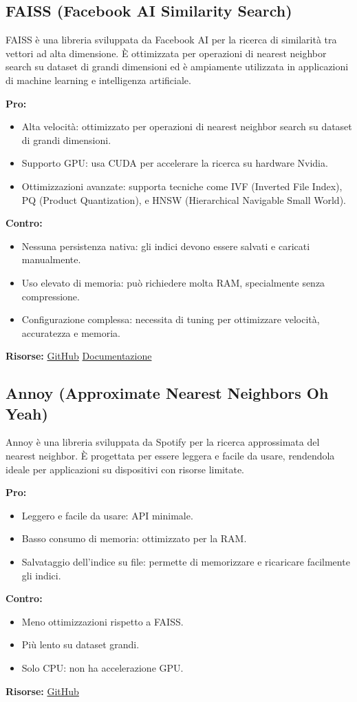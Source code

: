\documentclass{article}
\begin{document}
\subsection{FAISS (Facebook AI Similarity Search)}
FAISS è una libreria sviluppata da Facebook AI per la ricerca di similarità tra vettori ad alta dimensione. È ottimizzata per operazioni di nearest neighbor search su dataset di grandi dimensioni ed è ampiamente utilizzata in applicazioni di machine learning e intelligenza artificiale.

\textbf{Pro:}
\begin{itemize}
    \item Alta velocità: ottimizzato per operazioni di nearest neighbor search su dataset di grandi dimensioni.
    \item Supporto GPU: usa CUDA per accelerare la ricerca su hardware Nvidia.
    \item Ottimizzazioni avanzate: supporta tecniche come IVF (Inverted File Index), PQ (Product Quantization), e HNSW (Hierarchical Navigable Small World).
\end{itemize}
\textbf{Contro:}
\begin{itemize}
    \item Nessuna persistenza nativa: gli indici devono essere salvati e caricati manualmente.
    \item Uso elevato di memoria: può richiedere molta RAM, specialmente senza compressione.
    \item Configurazione complessa: necessita di tuning per ottimizzare velocità, accuratezza e memoria.
\end{itemize}
\textbf{Risorse:} \href{https://github.com/facebookresearch/faiss}{GitHub} \textbar{} \href{https://faiss.ai/}{Documentazione}

\subsection{Annoy (Approximate Nearest Neighbors Oh Yeah)}
Annoy è una libreria sviluppata da Spotify per la ricerca approssimata del nearest neighbor. È progettata per essere leggera e facile da usare, rendendola ideale per applicazioni su dispositivi con risorse limitate.

\textbf{Pro:}
\begin{itemize}
    \item Leggero e facile da usare: API minimale.
    \item Basso consumo di memoria: ottimizzato per la RAM.
    \item Salvataggio dell’indice su file: permette di memorizzare e ricaricare facilmente gli indici.
\end{itemize}
\textbf{Contro:}
\begin{itemize}
    \item Meno ottimizzazioni rispetto a FAISS.
    \item Più lento su dataset grandi.
    \item Solo CPU: non ha accelerazione GPU.
\end{itemize}
\textbf{Risorse:} \href{https://github.com/spotify/annoy}{GitHub}
\end{document}
